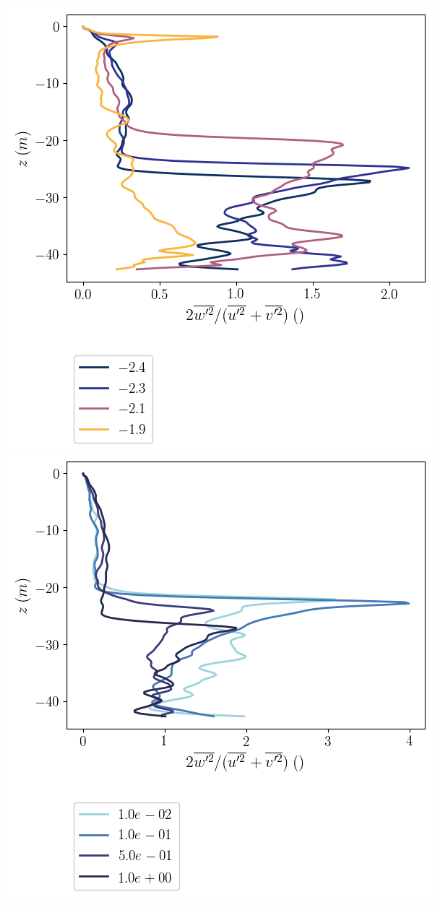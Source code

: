 \documentclass[draft,jgrga]{agutexSI2019}
\begin{document}
\begin{figure}[]
    \centering
    \begin{minipage}{0.5\textwidth}
        \includegraphics[trim={0 4cm 0 0},clip,width=\textwidth]{Figures/vel_var_ratio_cmp_dT_40hr_tav1_z_profile.png}
    \end{minipage}%
    \begin{minipage}{0.5\textwidth}
        \includegraphics[trim={0 4cm 0 0},clip,width=\textwidth]{Figures/vel_var_ratio_cmp_dslope_40hr_tav1_z_profile.png}

\end{minipage}
\end{figure}
\end{document}
